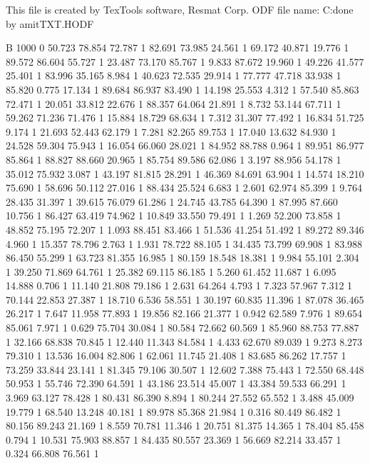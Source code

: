 This file is created by TexTools software, Resmat Corp.
ODF file name: C:\Users\Intel\Desktop\Texture done by amit\Sol TXT\solodf.HODF

B 1000 0
	50.723	78.854	72.787	1
	82.691	73.985	24.561	1
	69.172	40.871	19.776	1
	89.572	86.604	55.727	1
	23.487	73.170	85.767	1
	9.833	87.672	19.960	1
	49.226	41.577	25.401	1
	83.996	35.165	8.984	1
	40.623	72.535	29.914	1
	77.777	47.718	33.938	1
	85.820	0.775	17.134	1
	89.684	86.937	83.490	1
	14.198	25.553	4.312	1
	57.540	85.863	72.471	1
	20.051	33.812	22.676	1
	88.357	64.064	21.891	1
	8.732	53.144	67.711	1
	59.262	71.236	71.476	1
	15.884	18.729	68.634	1
	7.312	31.307	77.492	1
	16.834	51.725	9.174	1
	21.693	52.443	62.179	1
	7.281	82.265	89.753	1
	17.040	13.632	84.930	1
	24.528	59.304	75.943	1
	16.054	66.060	28.021	1
	84.952	88.788	0.964	1
	89.951	86.977	85.864	1
	88.827	88.660	20.965	1
	85.754	89.586	62.086	1
	3.197	88.956	54.178	1
	35.012	75.932	3.087	1
	43.197	81.815	28.291	1
	46.369	84.691	63.904	1
	14.574	18.210	75.690	1
	58.696	50.112	27.016	1
	88.434	25.524	6.683	1
	2.601	62.974	85.399	1
	9.764	28.435	31.397	1
	39.615	76.079	61.286	1
	24.745	43.785	64.390	1
	87.995	87.660	10.756	1
	86.427	63.419	74.962	1
	10.849	33.550	79.491	1
	1.269	52.200	73.858	1
	48.852	75.195	72.207	1
	1.093	88.451	83.466	1
	51.536	41.254	51.492	1
	89.272	89.346	4.960	1
	15.357	78.796	2.763	1
	1.931	78.722	88.105	1
	34.435	73.799	69.908	1
	83.988	86.450	55.299	1
	63.723	81.355	16.985	1
	80.159	18.548	18.381	1
	9.984	55.101	2.304	1
	39.250	71.869	64.761	1
	25.382	69.115	86.185	1
	5.260	61.452	11.687	1
	6.095	14.888	0.706	1
	11.140	21.808	79.186	1
	2.631	64.264	4.793	1
	7.323	57.967	7.312	1
	70.144	22.853	27.387	1
	18.710	6.536	58.551	1
	30.197	60.835	11.396	1
	87.078	36.465	26.217	1
	7.647	11.958	77.893	1
	19.856	82.166	21.377	1
	0.942	62.589	7.976	1
	89.654	85.061	7.971	1
	0.629	75.704	30.084	1
	80.584	72.662	60.569	1
	85.960	88.753	77.887	1
	32.166	68.838	70.845	1
	12.440	11.343	84.584	1
	4.433	62.670	89.039	1
	9.273	8.273	79.310	1
	13.536	16.004	82.806	1
	62.061	11.745	21.408	1
	83.685	86.262	17.757	1
	73.259	33.844	23.141	1
	81.345	79.106	30.507	1
	12.602	7.388	75.443	1
	72.550	68.448	50.953	1
	55.746	72.390	64.591	1
	43.186	23.514	45.007	1
	43.384	59.533	66.291	1
	3.969	63.127	78.428	1
	80.431	86.390	8.894	1
	80.244	27.552	65.552	1
	3.488	45.009	19.779	1
	68.540	13.248	40.181	1
	89.978	85.368	21.984	1
	0.316	80.449	86.482	1
	80.156	89.243	21.169	1
	8.559	70.781	11.346	1
	20.751	81.375	14.365	1
	78.404	85.458	0.794	1
	10.531	75.903	88.857	1
	84.435	80.557	23.369	1
	56.669	82.214	33.457	1
	0.324	66.808	76.561	1
